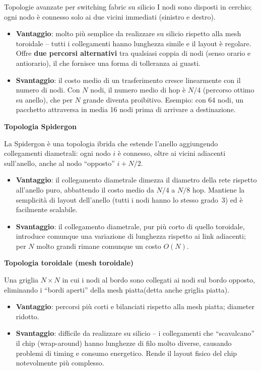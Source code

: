 \documentclass[a4paper,12pt]{report}
\begin{document}
\begin{notebox}{Topologie avanzate per switching fabric su silicio}
I nodi sono disposti in cerchio; ogni nodo è connesso solo ai due vicini
immediati (sinistro e destro).
\begin{itemize}
    \item \textbf{Vantaggio}: molto più semplice da realizzare su silicio
          rispetto alla mesh toroidale -- tutti i collegamenti hanno
          lunghezza simile e il layout è regolare. Offre
          \textbf{due percorsi alternativi} tra qualsiasi coppia di nodi
          (senso orario e antiorario), il che fornisce una forma di
          tolleranza ai guasti.
    \item \textbf{Svantaggio}: il costo medio di un trasferimento cresce
          linearmente con il numero di nodi. Con $N$ nodi, il numero
          medio di hop è $N/4$ (percorso ottimo su anello), che per $N$
          grande diventa proibitivo. Esempio: con 64 nodi, un pacchetto
          attraversa in media 16 nodi prima di arrivare a destinazione.
\end{itemize}

\vspace{0.3cm}
\textbf{Topologia Spidergon}

La Spidergon è una topologia ibrida che estende l'anello aggiungendo
collegamenti diametrali: ogni nodo $i$ è connesso, oltre ai vicini
adiacenti sull'anello, anche al nodo ``opposto'' $i + N/2$.
\begin{itemize}
    \item \textbf{Vantaggio}: il collegamento diametrale dimezza
          il diametro della rete rispetto all'anello puro, abbattendo
          il costo medio da $N/4$ a $N/8$ hop. Mantiene la semplicità
          di layout dell'anello (tutti i nodi hanno lo stesso grado~3)
          ed è facilmente scalabile.
    \item \textbf{Svantaggio}: il collegamento diametrale, pur più
          corto di quello toroidale, introduce comunque una variazione
          di lunghezza rispetto ai link adiacenti; per $N$ molto grandi
          rimane comunque un costo $O(N)$.
\end{itemize}


\vspace{0.cm}
\textbf{Topologia toroidale (mesh toroidale)}

Una griglia $N \times N$ in cui i nodi al bordo sono collegati ai nodi
sul bordo opposto, eliminando i ``bordi aperti'' della mesh piatta(detta anche griglia piatta).
\begin{itemize}
    \item \textbf{Vantaggio}: percorsi più corti e bilanciati rispetto
          alla mesh piatta; diameter ridotto.
    \item \textbf{Svantaggio}: difficile da realizzare su silicio --
          i collegamenti che ``scavalcano'' il chip (wrap-around) hanno
          lunghezze di filo molto diverse, causando problemi di timing
          e consumo energetico. Rende il layout fisico del chip
          notevolmente più complesso.
\end{itemize}


\end{notebox}
\end{document}
